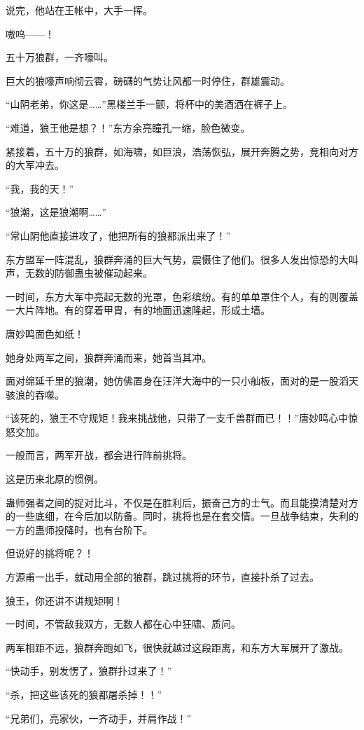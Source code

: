 \begin{this_body}
说完，他站在王帐中，大手一挥。

嗷呜——！

五十万狼群，一齐嚎叫。

巨大的狼嚎声响彻云霄，磅礴的气势让风都一时停住，群雄震动。

“山阴老弟，你这是……”黑楼兰手一颤，将杯中的美酒洒在裤子上。

“难道，狼王他是想？！”东方余亮瞳孔一缩，脸色微变。

紧接着，五十万的狼群，如海啸，如巨浪，浩荡恢弘，展开奔腾之势，竞相向对方的大军冲去。

“我，我的天！”

“狼潮，这是狼潮啊……”

“常山阴他直接进攻了，他把所有的狼都派出来了！”

东方盟军一阵混乱，狼群奔涌的巨大气势，震慑住了他们。很多人发出惊恐的大叫声，无数的防御蛊虫被催动起来。

一时间，东方大军中亮起无数的光罩，色彩缤纷。有的单单罩住个人，有的则覆盖一大片阵地。有的穿着甲胄，有的地面迅速隆起，形成土墙。

唐妙鸣面色如纸！

她身处两军之间，狼群奔涌而来，她首当其冲。

面对绵延千里的狼潮，她仿佛置身在汪洋大海中的一只小舢板，面对的是一股滔天骇浪的吞噬。

“该死的，狼王不守规矩！我来挑战他，只带了一支千兽群而已！！”唐妙鸣心中惊怒交加。

一般而言，两军开战，都会进行阵前挑将。

这是历来北原的惯例。

蛊师强者之间的捉对比斗，不仅是在胜利后，振奋己方的士气。而且能摸清楚对方的一些底细，在今后加以防备。同时，挑将也是在套交情。一旦战争结束，失利的一方的蛊师投降时，也有台阶下。

但说好的挑将呢？！

方源甫一出手，就动用全部的狼群，跳过挑将的环节，直接扑杀了过去。

狼王，你还讲不讲规矩啊！

一时间，不管敌我双方，无数人都在心中狂啸、质问。

两军相距不远，狼群奔跑如飞，很快就越过这段距离，和东方大军展开了激战。

“快动手，别发愣了，狼群扑过来了！”

“杀，把这些该死的狼都屠杀掉！！”

“兄弟们，亮家伙，一齐动手，并肩作战！”


\end{this_body}
